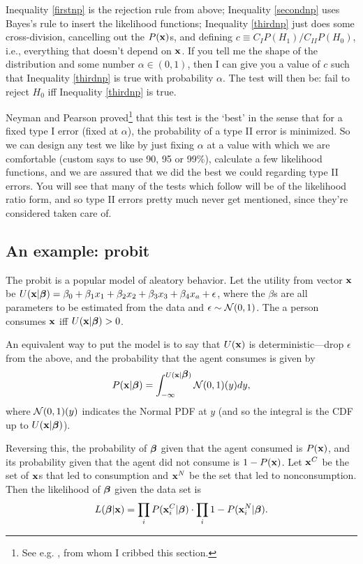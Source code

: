 Inequality \ref{firstnp} is the rejection rule from above; Inequality
\ref{secondnp} uses Bayes's rule to insert the likelihood functions;
Inequality \ref{thirdnp} just does some cross-division, cancelling out the
$P({\bf x})$s, and defining $c\equiv C_IP(H_1)/C_{II}P(H_0)$, i.e., everything
that doesn't depend on ${\bf x}$. If you tell me the shape of the distribution
and some number $\alpha\in(0,1)$, then I can give you a value of $c$
such that Inequality \ref{thirdnp} is true with probability
$\alpha$. The test will then be: fail to reject $H_0$ iff Inequality
\ref{thirdnp} is true.

Neyman and Pearson proved\footnote{See
e.g. \cite[189--191]{amemiya:ez}, from whom I cribbed
this section.}  that this test is the `best' in the sense that for a
fixed type I error (fixed at $\alpha$), the probability of a type II
error is minimized. So we can design any test we like by just fixing $\alpha$
at a value with which we are comfortable (custom says to use
90, 95 or 99\%), calculate a few likelihood functions, and we are assured
that we did the best we could regarding type II errors. You will see that
many of the tests which follow will be of the likelihood ratio form,
and so type II errors pretty much never get mentioned, since they're
considered taken care of.




\subsection{An example: probit} 
The probit is a popular model of aleatory behavior. 
Let the utility from vector ${\bf x}$ be 
$U({\bf x}|{\mbox{\boldmath$\beta$}}) = \beta_0 + \beta_1 x_1 + \beta_2 x_2 + \beta_3 x_3 + \beta_4 x_a + \epsilon$,
where the $\beta$s are all parameters to be estimated from
the data and $\epsilon \sim {\cal N}(0,1)$.
The a person consumes ${\bf x}$ iff $U({\bf x}|{\mbox{\boldmath$\beta$}})>0$. 

An equivalent way to put the model is to say that $U({\bf x})$ is
deterministic---drop $\epsilon$ from the above, and the probability that
the agent consumes is given by
$$P({\bf x}|{\mbox{\boldmath$\beta$}}) = \int_{-\infty}^{U({\bf x}|{\mbox{\boldmath$\beta$}})} {\cal N}(0,1)(y) dy,$$
where ${\cal N}(0,1)(y)$ indicates the Normal PDF at $y$ (and so the
integral is the CDF up to $U({\bf x}|{\mbox{\boldmath$\beta$}})$).

Reversing this, the probability of ${\mbox{\boldmath$\beta$}}$ given that the agent
consumed is $P({\bf x})$, and its probability given that the agent did not
consume is $1-P({\bf x})$. Let ${\bf x}^C$ be the set of ${\bf x}$s that led to
consumption and ${\bf x}^N$ be the set that led to nonconsumption. Then the
likelihood of ${\mbox{\boldmath$\beta$}}$ given the data set is 
$$L({\mbox{\boldmath$\beta$}}|{\bf x}) = \prod_{i} P({\bf x}^C_i|{\mbox{\boldmath$\beta$}}) \cdot \prod_{i} 1-P({\bf x}^N_i|{\mbox{\boldmath$\beta$}}).$$ 

